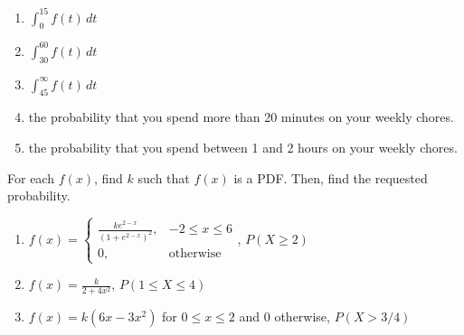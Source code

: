 \begin{Answer}[ref = rep_int]
\begin{enumerate}
\item $\int_0^{15} f(t)\,dt$
\item $\int_{30}^{60} f(t)\,dt$
\item $\int_{45}^{\infty} f(t)\,dt$
\item the probability that you spend more than 20 minutes on your weekly 
chores.
\item the probability that you spend between 1 and 2 hours on your weekly 
chores.
\end{enumerate}
\end{Answer}

\begin{Exercise}[title = {Using PDFs to Find Probabilities}, label = int_pdf]
For each $f(x)$, find $k$ such that $f(x)$ is a PDF. Then, find the requested 
probability. 
\begin{enumerate}
\item $f(x) = 
\begin{cases}
\frac{ke^{2 - x}}{\left(1 + e^{2 - x} \right)^2},&-2 \leq x \leq 6\\
0,&\text{otherwise}
\end{cases}$, $P(X \geq 2)$
\item $f(x) = \frac{k}{2 + 4x^2}$, $P(1 \leq X \leq 4)$
\item $f(x) = k(6x - 3x^2)$ for $0 \leq x \leq 2$ and 0 otherwise, $P(X > 3/4)$
\vspace{95mm}
\end{enumerate}
\end{Exercise}

